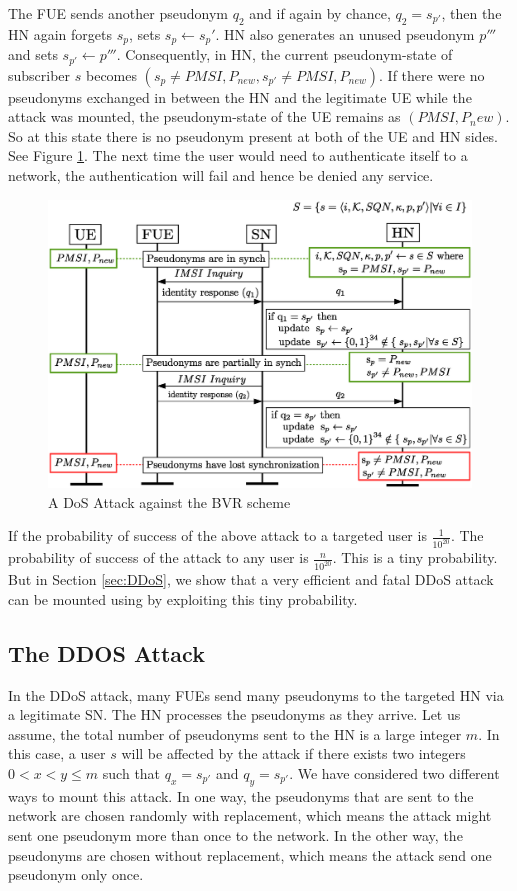 \documentclass{llncs} %
\begin{document}
The FUE sends another pseudonym $q_2$ and if again by chance, $q_2 = s_{p'}$, then the HN again forgets $s_{p}$, sets $s_p \leftarrow s_p'$. HN also generates an unused pseudonym $p'''$ and sets $s_{p'} \leftarrow p'''$. Consequently, in HN, the current pseudonym-state of subscriber $s$ becomes $\left(s_{p} \neq PMSI,P_{new},s_{p'} \neq PMSI,P_{new}\right)$. If there were no pseudonyms exchanged in between the HN and the legitimate UE while the attack was mounted, the pseudonym-state of the UE remains as $\left(PMSI,P_new\right)$. So at this state there is no pseudonym present at both of the UE and HN sides. See Figure \ref{fig:dos_attack}. The next time the user would need to authenticate itself to a network, the authentication will fail and hence be denied any service.

\begin{figure}[]
  \centering
    \includegraphics[width=\textwidth]{DDoS.eps}
  \caption{A DoS Attack against the BVR scheme}
  \label{fig:dos_attack}	
\end{figure}

If the probability of success of the above attack to a targeted user is $\frac{1}{10^{20}}$. The probability of   success of the attack to any user is $\frac{n}{10^{20}}$. This is a tiny probability. But in Section \ref{sec:DDoS}, we show that a very efficient and fatal DDoS attack can be mounted using by exploiting this tiny probability.

\subsection{The DDOS Attack}
In the DDoS attack, many FUEs send many pseudonyms to the targeted HN via a legitimate SN. The HN processes the pseudonyms as they arrive. Let us assume, the total number of pseudonyms sent to the HN is a large integer $m$. In this case, a user $s$ will be affected by the attack if there exists two integers $0 < x < y \leq m$ such that $q_{x} = s_{p'}$ and $q_{y} = s_{p'}$. We have considered two different ways to mount this attack. In one way, the pseudonyms that are sent to the network are chosen randomly with replacement, which means the attack might sent one pseudonym more than once to the network. In the other way, the pseudonyms are chosen without replacement, which means the attack send one pseudonym only once.
\end{document}
